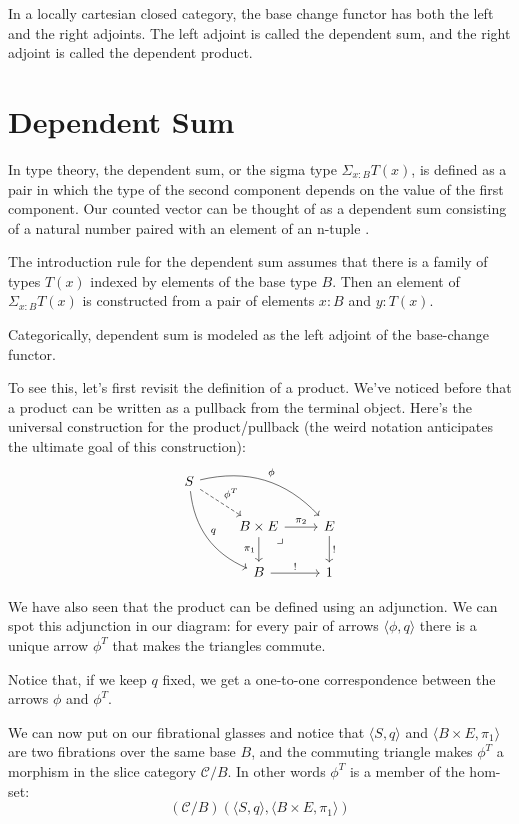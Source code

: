 \documentclass[DaoFP]{subfiles}
\begin{document}
In a locally cartesian closed category, the base change functor has both the left and the right adjoints. The left adjoint is called the dependent sum, and the right adjoint is called the dependent product.


\section{Dependent Sum}

In type theory, the dependent sum, or the sigma type $\Sigma_{x : B} T(x)$, is defined as a pair in which the type of the second component depends on the value of the first component. Our counted vector can be thought of as a dependent sum consisting of a natural number  paired with an element of an n-tuple .

The introduction rule for the dependent sum assumes that there is a family of types $T(x)$ indexed by elements of the base type $B$. Then an element of $\Sigma_{x : B} T(x)$ is constructed from a pair of elements $x \colon B$ and $y \colon T(x)$. 

Categorically, dependent sum is modeled as the left adjoint of the base-change functor. 

To see this, let's first revisit the definition of a product. We've noticed before that a product can be written as a pullback from the terminal object. Here's the universal construction for the product/pullback (the weird notation anticipates the ultimate goal of this construction):
\[
 \begin{tikzcd}
 S
 \arrow[dr, dashed, "\phi^T"]
 \arrow[drr, bend left, "\phi"]
 \arrow[ddr, bend right, "q"]
 \\
 &B \times E
\arrow[dr, phantom,  , very near start, "\lrcorner"]
 \arrow[r, "\pi_2"]
 \arrow[d, "\pi_1"']
 &E
 \arrow[d, "!"]
 \\
 &B
 \arrow[r, "!"]
 &1
  \end{tikzcd}
\]

We have also seen that the product can be defined using an adjunction. We can spot this adjunction in our diagram: for every pair of arrows $\langle \phi, q \rangle$ there is a unique arrow $\phi^T$ that makes the triangles commute. 

Notice that, if we keep $q$ fixed, we get a one-to-one correspondence between the arrows $\phi$ and $\phi^T$. 

We can now put on our fibrational glasses and notice that $\langle S, q\rangle$ and $\langle B \times E, \pi_1 \rangle$ are two fibrations over the same base $B$, and the commuting triangle makes $\phi^T$ a morphism in the slice category $\mathcal{C}/B$. In other words $\phi^T$ is a member of the hom-set:
 \[ (\mathcal{C}/B)(\langle S, q \rangle, \langle B \times E, \pi_1 \rangle)  \]
 
\end{document}
